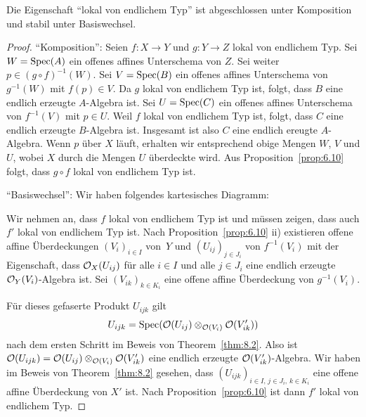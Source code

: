 \begin{prop}
\label{prop:8.11}
	Die Eigenschaft \enquote{lokal von endlichem Typ} ist abgeschlossen unter Komposition und stabil unter Basiswechsel.
	\begin{proof}
		\enquote{Komposition}: Seien $f\colon X \to Y$ und $g \colon Y \to Z$ lokal von endlichem Typ. Sei $W = \operatorname{Spec}(A)$ ein offenes affines Unterschema von $Z$. Sei weiter $p \in (g \circ f)^{-1}(W)$. Sei $V=\operatorname{Spec}(B)$ ein offenes affines Unterschema von $g^{-1}(W)$ mit $f(p) \in V$. Da $g$ lokal von endlichem Typ ist, folgt, dass $B$ eine endlich erzeugte $A$-Algebra ist. Sei $U = \operatorname{Spec}(C)$ ein offenes affines Unterschema von $f^{-1}(V)$ mit $p \in U$. Weil $f$ lokal von endlichem Typ ist, folgt, dass $C$ eine endlich erzeugte $B$-Algebra ist. Insgesamt ist also $C$ eine endlich ereugte $A$-Algebra. Wenn $p$ über $X$ läuft, erhalten wir entsprechend obige Mengen $W$, $V$ und $U$, wobei $X$ durch die Mengen $U$ überdeckte wird. Aus Proposition~\ref{prop:6.10} folgt, dass $g\circ f$ lokal von endlichem Typ ist.

		\enquote{Basiswechsel}: Wir haben folgendes kartesisches Diagramm:
		\begin{center}
		\end{center}
		Wir nehmen an, dass $f$ lokal von endlichem Typ ist und müssen zeigen, dass auch $f'$ lokal von endlichem Typ ist. Nach Proposition~\ref{prop:6.10} ii) existieren offene affine Überdeckungen $(V_i)_{i\in I}$ von~$Y$ und $(U_{ij})_{j\in J_i}$ von $f^{-1}(V_i)$ mit der Eigenschaft, dass $\mathcal{O}_X(U_{ij})$ für alle $i\in I$ und alle $j \in J_i$ eine endlich erzeugte $\mathcal{O}_Y(V_i)$-Algebra ist. Sei $(V_{ik})_{k \in K_i}$ eine offene affine Überdeckung von $g^{-1}(V_i)$.
		\begin{center}
		\end{center}
		Für dieses gefaserte Produkt $U_{ijk}$ gilt
		\[
			U_{ijk} = \operatorname{Spec}(\mathcal{O}(U_{ij}) \otimes_{\mathcal{O}(V_i)} \mathcal{O}(V_{ik}'))
		\]
		nach dem ersten Schritt im Beweis von Theorem~\ref{thm:8.2}. Also ist $\mathcal{O}(U_{ijk}) = \mathcal{O}(U_{ij}) \otimes_{\mathcal{O}(V_i)} \mathcal{O}(V_{ik}')$ eine endlich erzeugte $\mathcal{O}(V_{ik}')$-Algebra. Wir haben im Beweis von Theorem~\ref{thm:8.2} gesehen, dass $(U_{ijk})_{i\in I,\,j\in J_i,\,k\in K_i}$ eine offene affine Überdeckung von $X'$ ist. Nach Proposition~\ref{prop:6.10} ist dann $f'$ lokal von endlichem Typ.
	\end{proof}
\end{prop}
